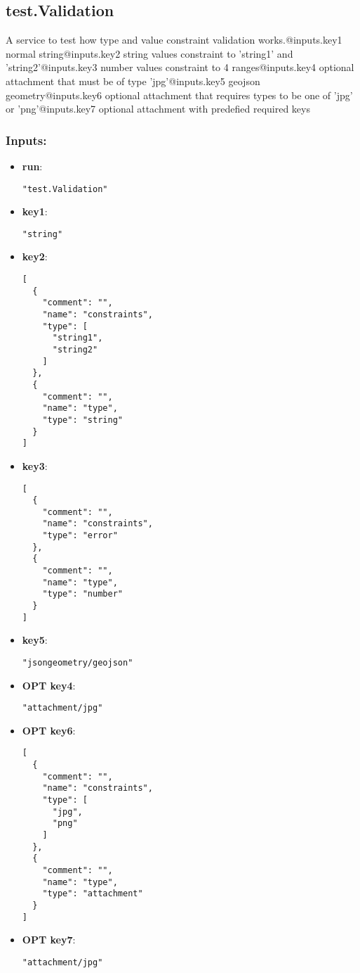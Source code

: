 \subsection{test.Validation}
A
 service to test how type and value constraint validation 
works.@inputs.key1 normal string@inputs.key2 string values constraint to
 'string1' and 'string2'@inputs.key3 number values constraint to 4 
ranges@inputs.key4 optional attachment that must be of type 
'jpg'@inputs.key5 geojson geometry@inputs.key6 optional attachment that 
requires types to be one of 'jpg' or 'png'@inputs.key7 optional 
attachment with predefied required keys
\subsubsection*{Inputs:}
\begin{itemize}
    \item \textbf{run}: 
\begin{lstlisting}
"test.Validation"
\end{lstlisting}
    \item \textbf{key1}: 
\begin{lstlisting}
"string"
\end{lstlisting}
    \item \textbf{key2}: 
\begin{lstlisting}
[
  {
    "comment": "", 
    "name": "constraints", 
    "type": [
      "string1", 
      "string2"
    ]
  }, 
  {
    "comment": "", 
    "name": "type", 
    "type": "string"
  }
]
\end{lstlisting}
    \item \textbf{key3}: 
\begin{lstlisting}
[
  {
    "comment": "", 
    "name": "constraints", 
    "type": "error"
  }, 
  {
    "comment": "", 
    "name": "type", 
    "type": "number"
  }
]
\end{lstlisting}
    \item \textbf{key5}: 
\begin{lstlisting}
"jsongeometry/geojson"
\end{lstlisting}
    \item \textbf{OPT key4}: 
\begin{lstlisting}
"attachment/jpg"
\end{lstlisting}
    \item \textbf{OPT key6}: 
\begin{lstlisting}
[
  {
    "comment": "", 
    "name": "constraints", 
    "type": [
      "jpg", 
      "png"
    ]
  }, 
  {
    "comment": "", 
    "name": "type", 
    "type": "attachment"
  }
]
\end{lstlisting}
    \item \textbf{OPT key7}: 
\begin{lstlisting}
"attachment/jpg"
\end{lstlisting}
  \end{itemize}

